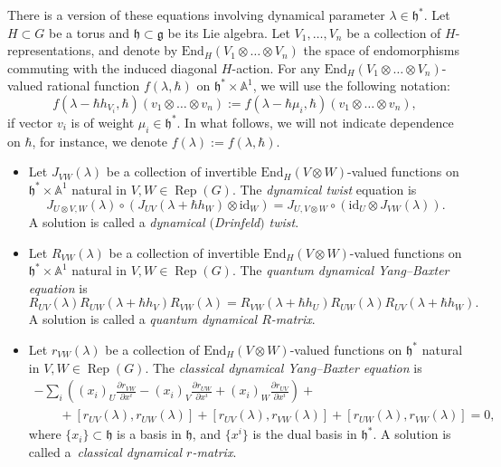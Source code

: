 \documentclass[10pt,a4paper]{article}
\numberwithin{equation}{section}
\newcommand{\g}{\mathfrak{g}}
\newcommand{\h}{\mathfrak{h}}
\newcommand{\End}{\mathrm{End}}
\newcommand{\id}{\mathrm{id}}
\DeclareMathOperator{\Rep}{Rep}
\begin{document}
	There is a version of these equations involving dynamical parameter $\lambda \in \h^*$. Let $H \subset G$ be a torus and $\h \subset \g$ be its Lie algebra. Let $V_1,\dots,V_n$ be a collection of $H$-representations, and denote by $\End_{H}(V_1 \otimes \dots \otimes V_n)$ the space of endomorphisms commuting with the induced diagonal $H$-action. For any $\End_{H}(V_1 \otimes \dots \otimes V_n)$-valued rational function $f(\lambda,\hbar)$ on $\h^*\times \mathbb{A}^1$, we will use the following notation:
	\[
	f(\lambda-\hbar h_{V_i},\hbar) (v_1 \otimes \dots \otimes v_n) := f(\lambda - \hbar \mu_i,\hbar) (v_1\otimes \dots \otimes v_n),
	\]
	if vector $v_i$ is of weight $\mu_i \in \h^*$. In what follows, we will not indicate dependence on $\hbar$, for instance, we denote $f(\lambda):=f(\lambda,\hbar)$.
	
	\begin{Definition}\qquad
		\label{def::all_dynamical}
		\begin{itemize}\itemsep=0pt
			\item Let $J_{VW}(\lambda)$ be a collection of invertible $\End_{H}(V \otimes W)$-valued functions on $\h^*\times \mathbb{A}^1$ natural in $V,W\in \Rep(G)$. The \emph{dynamical twist} equation is
			\begin{equation}
				\label{eq::dyn_twist}
				J_{U \otimes V,W}(\lambda) \circ (J_{UV}(\lambda+\hbar h_W) \otimes \id_W) = J_{U,V\otimes W} \circ (\id_U \otimes J_{VW}(\lambda)).
			\end{equation}
			A solution is called a \emph{dynamical $($Drinfeld$)$ twist}.
			\item Let $R_{VW}(\lambda)$ be a collection of invertible $\End_{H}(V \otimes W)$-valued functions on $\h^*\times \mathbb{A}^1$ natural in $V,W\in \Rep(G)$. The \emph{quantum dynamical Yang--Baxter equation} is
			\begin{equation}
				\label{eq::qdybe}
				R_{UV}(\lambda) R_{UW} (\lambda + \hbar h_V) R_{VW}(\lambda) = R_{VW}(\lambda+\hbar h_U) R_{UW}(\lambda) R_{UV}(\lambda + \hbar h_W).
			\end{equation}
			A solution is called a \emph{quantum dynamical $R$-matrix}.
			\item Let $r_{VW}(\lambda)$ be a collection of $\End_{H}(V \otimes W)$-valued functions on $\h^*$ natural in $V,W\in \Rep(G)$. The \emph{classical dynamical Yang--Baxter equation} is
			\begin{gather}
					-\sum\limits_i \left( (x_i)_{U} \frac{\partial r_{VW}}{\partial x^i} - (x_i)_V \frac{\partial r_{UW}}{\partial x^i} + (x_i)_W \frac{\partial r_{UV}}{\partial x^i}\right) +\nonumber \\
					\qquad{}+[r_{UV}(\lambda),r_{UW}(\lambda)] + [r_{UV}(\lambda),r_{VW}(\lambda)] + [r_{UW}(\lambda), r_{VW}(\lambda)] = 0,\label{eq::cdybe}
			\end{gather}
			where $\{x_i\} \subset \h$ is a basis in $\h$, and $\bigl\{x^i\bigr\}$ is the dual basis in $\h^*$. A solution is called a~\emph{classical dynamical $r$-matrix}.
		\end{itemize}
	\end{Definition}
	
\end{document}
